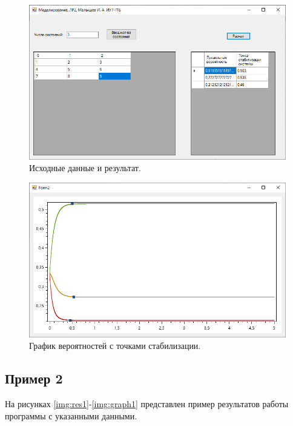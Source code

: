 \documentclass[12pt]{report}
\begin{document}
\begin{figure}[H]
	\begin{center}
		\includegraphics[scale=0.6]{imgs/res2.png}
	\end{center}
	\caption{Исходные данные и результат.}
	\label{img:res2}
\end{figure}

\begin{figure}[H]
	\begin{center}
		\includegraphics[scale=0.6]{imgs/graph2.png}
	\end{center}
	\caption{График вероятностей с точками стабилизации.}
	\label{img:graph2}
\end{figure}

\subsection{Пример 2}

На рисунках \ref{img:res1}-\ref{img:graph1} представлен пример результатов работы программы с указанными данными.
\end{document}
